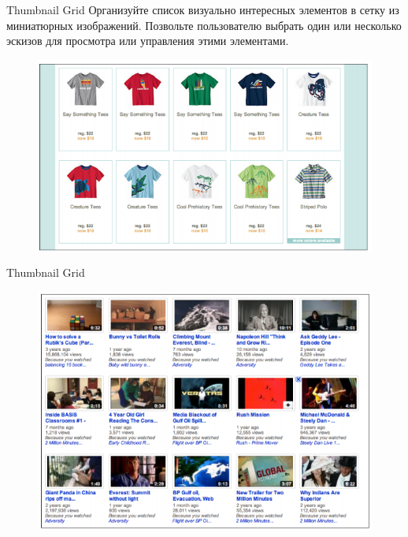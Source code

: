 \documentclass{beamer}
\begin{document}
\begin{frame}[t]{Thumbnail Grid}
	Организуйте список визуально интересных элементов в сетку из миниатюрных изображений. Позвольте пользователю выбрать один или несколько эскизов для просмотра или управления этими элементами.
	\begin{figure}[h]
		\centering
		\includegraphics[scale=0.5]{images/lec07-pic54.png}
	\end{figure}
\end{frame}	

\begin{frame}[t]{Thumbnail Grid}
	\begin{figure}[h]
		\centering
		\includegraphics[scale=0.5]{images/lec07-pic55.png}
	\end{figure}
\end{frame}	
\end{document}
